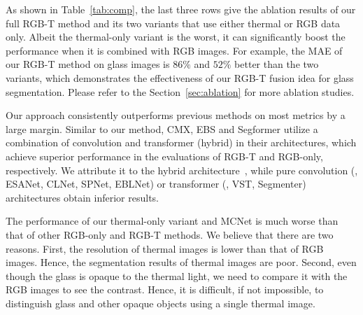 As shown in Table~\ref{tab:comp}, the last three rows give the ablation results of our full RGB-T method and its two variants that use either thermal or RGB data only. Albeit the thermal-only variant is the worst, it can significantly boost the performance when it is combined with RGB images. For example, the MAE of our RGB-T method on glass images is $86\%$ and $52\%$ better than the two variants, which demonstrates the effectiveness of  our RGB-T fusion idea for glass segmentation. Please refer to the Section~\ref{sec:ablation} for more ablation studies.

Our approach consistently outperforms previous methods on most metrics by a large margin. Similar to our method, CMX, EBS and Segformer utilize a combination of convolution and transformer (hybrid) in their architectures, which achieve superior performance in the evaluations of RGB-T and RGB-only, respectively. We attribute it to the hybrid architecture~\cite{carion2020end, xu2021line}, while pure convolution (\eg, ESANet, CLNet, SPNet, EBLNet) or transformer (\eg, VST, Segmenter) architectures obtain inferior results. 

The performance of our thermal-only variant and MCNet is much worse than that of other RGB-only and RGB-T methods. We believe that there are two reasons. First, the resolution of thermal images is lower than that of RGB images. Hence, the segmentation results of thermal images are poor. Second, even though the glass is opaque to the thermal light, we need to compare it with the RGB images to see the contrast. Hence, it is difficult, if not impossible, to distinguish glass and other opaque objects using a single thermal image. 




